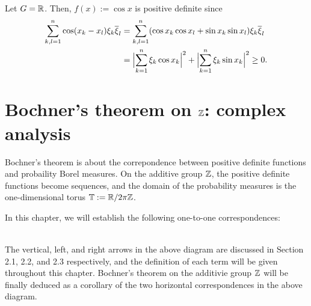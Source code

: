 \documentclass[a4paper]{article}
\begin{document}
\begin{ex}
Let $G=\R$.
Then, $f(x):=\cos x$ is positive definite since
\begin{align*}
\sum_{k,l=1}^n\cos(x_k-x_l)\xi_k\bar\xi_l
&=\sum_{k,l=1}^n(\cos x_k\cos x_l+\sin x_k\sin x_l)\xi_k\bar\xi_l\\
&=\Bigl|\sum_{k=1}^n\xi_k\cos x_k\Bigr|^2+\Bigl|\sum_{k=1}^n\xi_k\sin x_k\Bigr|^2\ge0.
\end{align*}
\end{ex}




\newpage
\section{Bochner's theorem on $\Z$: complex analysis}

Bochner's theorem is about the correpondence between positive definite functions and probaility Borel measures.
On the additive group $\Z$, the positive definite functions become sequences, and the domain of the probability measures is the one-dimensional torus $\T:=\R/2\pi\Z$.

In this chapter, we will establish the following one-to-one correspondences:
\begin{figure}[h]
\centering
{}
\end{figure}\\
The vertical, left, and right arrows in the above diagram are discussed in Section 2.1, 2.2, and 2.3 respectively, and the definition of each term will be given throughout this chapter.
Bochner's theorem on the additivie group $\Z$ will be finally deduced as a corollary of the two horizontal correspondences in the above diagram.
\end{document}
